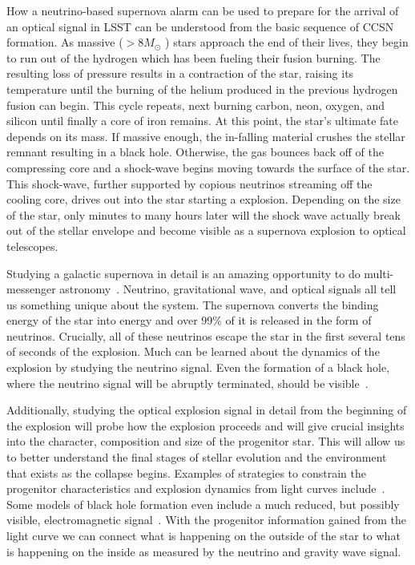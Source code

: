\documentclass[12pt, letterpaper]{article}
\begin{document}
How a neutrino-based supernova alarm can be used to prepare for the
arrival of an optical signal in LSST can be understood from the basic
sequence of CCSN formation.  As massive ($ > 8 M_\odot$ ) stars
approach the end of their lives, they begin to run out of the hydrogen
which has been fueling their fusion burning.  The resulting loss of
pressure results in a contraction of the star, raising its temperature
until the burning of the helium produced in the previous hydrogen
fusion can begin. This cycle repeats, next burning carbon, neon,
oxygen, and silicon until finally a core of iron remains. At this
point, the star's ultimate fate depends on its mass.  If massive
enough, the in-falling material crushes the stellar remnant resulting
in a black hole.  Otherwise, the gas bounces back off of the
compressing core and a shock-wave begins moving towards the surface of
the star.  This shock-wave, further supported by copious neutrinos
streaming off the cooling core, drives out into the star starting a
explosion.  Depending on the size of the star, only minutes to many
hours later will the shock wave actually break out of the stellar
envelope and become visible as a supernova explosion to optical
telescopes.

Studying a galactic supernova in detail is an amazing opportunity to
do multi-messenger astronomy~\cite{2016MNRAS.461.3296N}.  Neutrino,
gravitational wave, and optical signals all tell us something unique
about the system.  The supernova converts the binding energy of the
star into energy and over 99\% of it is released in the form of
neutrinos.  Crucially, all of these neutrinos escape the star in the
first several tens of seconds of the explosion. Much can be learned
about the dynamics of the explosion by studying the neutrino signal.
Even the formation of a black hole, where the neutrino signal will be
abruptly terminated, should be visible~\cite{2011ApJ...730...70O,
  2017hsn..book.1555O}.

Additionally, studying the optical explosion signal in detail from the
beginning of the explosion will probe how the explosion proceeds and
will give crucial insights into the character, composition and size of
the progenitor star.  This will allow us to better understand the
final stages of stellar evolution and the environment that exists as
the collapse begins.  Examples of strategies to constrain the
progenitor characteristics and explosion dynamics from light curves
include~\cite{2010ApJ...725..904N, 2017NatPh..13..510Y,
  2018ApJ...856..146A}.  Some models of black hole formation even
include a much reduced, but possibly visible, electromagnetic
signal~\cite{2013ApJ...769..109L}. With the progenitor information
gained from the light curve we can connect what is happening on the
outside of the star to what is happening on the inside as measured by
the neutrino and gravity wave signal.
 
\end{document}
